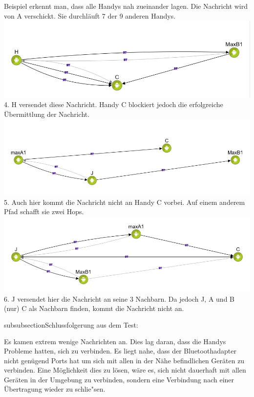 Beispiel erkennt man, dass alle Handys nah zueinander lagen. Die
Nachricht wird von A verschickt. Sie durchläuft 7 der 9 anderen Handys.
\includegraphics[width=1.0\textwidth]{belege/grosstests/Bilder/Miserfolg3.jpg} 4. H versendet
diese Nachricht. Handy C blockiert jedoch die erfolgreiche Übermittlung
der Nachricht. 
\includegraphics[width=1.0\textwidth]{belege/grosstests/Bilder/Miserfolg2.jpg}
5. Auch hier kommt die Nachricht nicht an Handy C vorbei. Auf einem
anderem Pfad schafft sie zwei Hops.
\includegraphics[width=1.0\textwidth]{belege/grosstests/Bilder/Miserfolg1.jpg} 6. J versendet
hier die Nachricht an seine 3 Nachbarn. Da jedoch J, A und B (nur) C als
Nachbarn finden, kommt die Nachricht nicht an.

subsubsection{Schlussfolgerung aus dem
Test:}\label{schlussfolgerung-aus-dem-test}

Es kamen extrem wenige Nachrichten an. Dies lag daran, dass die Handys
Probleme hatten, sich zu verbinden. Es liegt nahe, dass der
Bluetoothadapter nicht genügend Ports hat um sich mit allen in der Nähe
befindlichen Geräten zu verbinden. Eine Möglichkeit dies zu lösen, wäre
es, sich nicht dauerhaft mit allen Geräten in der Umgebung zu verbinden,
sondern eine Verbindung nach einer Übertragung wieder zu schlie"sen.

